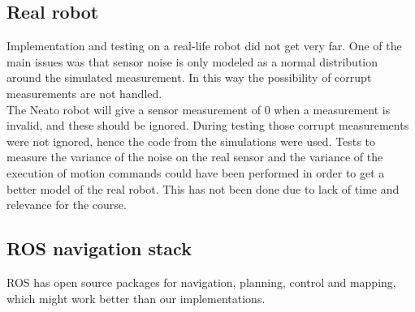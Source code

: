 \subsection{Real robot}
Implementation and testing on a real-life robot did not get very far.
One of the main issues was that sensor noise is only modeled as a normal distribution around the simulated measurement. In this way the possibility of corrupt measurements are not handled.\\

The Neato robot will give a sensor measurement of 0 when a measurement is invalid, and these should be ignored. During testing those corrupt measurements were not ignored, hence the code from the simulations were used. Tests to measure the variance of the noise on the real sensor and the variance of the execution of motion commands could have been performed in order to get a better model of the real robot. This has not been done due to lack of time and relevance for the course.

\subsection{ROS navigation stack}


ROS has open source packages for navigation, planning, control and mapping, which might work better than our implementations.


